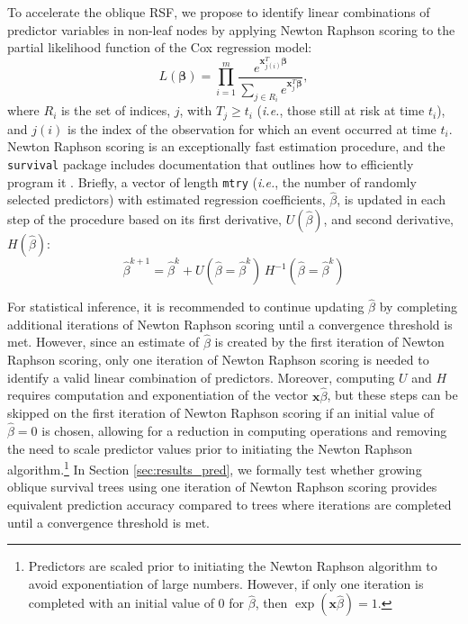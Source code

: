 \documentclass[12pt]{article}\usepackage[]{graphicx}\usepackage[]{xcolor}
\newcommand{\ie}{\textit{i.e.}}
\newcommand{\secref}[1]{Section \ref{#1}}
\begin{document}
To accelerate the oblique RSF, we propose to identify linear combinations of predictor variables in non-leaf nodes by applying Newton Raphson scoring to the partial likelihood function of the Cox regression model:
\begin{equation}\label{eqn:cox-partial-likelihood}
L(\bm\beta) = \prod_{i=1}^m \frac{e^{\bm{x}_{j(i)}^T \bm\beta}}{\sum_{j \in R_i} e^{\bm{x}_j^T \bm\beta}},
\end{equation}
where $R_i$ is the set of indices, $j$, with $T_j \geq t_i$ (\ie, those still at risk at time $t_i$), and $j(i)$ is the index of the observation for which an event occurred at time $t_i$. Newton Raphson scoring is an exceptionally fast estimation procedure, and the \texttt{survival} package \citep{survival} includes documentation that outlines how to efficiently program it \citep{therneau_survival_2022}. Briefly, a vector of length \texttt{mtry} (\ie, the number of randomly selected predictors) with estimated regression coefficients, $\hat{\beta}$, is updated in each step of the procedure based on its first derivative, $U(\hat{\beta})$, and second derivative, $H(\hat{\beta})$:
$$ \hat{\beta}^{k+1} =  \hat{\beta}^{k} + U(\hat{\beta} = \hat{\beta}^{k})\, H^{-1}(\hat{\beta} = \hat{\beta}^{k}) $$

For statistical inference, it is recommended to continue updating $\hat{\beta}$ by completing additional iterations of Newton Raphson scoring until a convergence threshold is met. However, since an estimate of $\hat{\beta}$ is created by the first iteration of Newton Raphson scoring, only one iteration of Newton Raphson scoring is needed to identify a valid linear combination of predictors. Moreover, computing $U$ and $H$ requires computation and exponentiation of the vector $\bm{x}\hat{\beta}$, but these steps can be skipped on the first iteration of Newton Raphson scoring if an initial value of $\hat{\beta} = 0$ is chosen, allowing for a reduction in computing operations and removing the need to scale predictor values prior to initiating the Newton Raphson algorithm.\footnote{Predictors are scaled prior to initiating the Newton Raphson algorithm to avoid exponentiation of large numbers. However, if only one iteration is completed with an initial value of 0 for $\hat{\beta}$, then $\exp(\bm{x}\hat{\beta}) = 1$.} In \secref{sec:results_pred}, we formally test whether growing oblique survival trees using one iteration of Newton Raphson scoring provides equivalent prediction accuracy compared to trees where iterations are completed until a convergence threshold is met.
\end{document}
